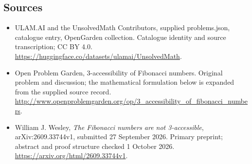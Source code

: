\documentclass[11pt,a4paper]{article}
\begin{document}
\subsection{Sources}
\begin{itemize}
\item[S1] ULAM.AI and the UnsolvedMath Contributors, supplied problems.json, catalogue entry, OpenGarden collection. Catalogue identity and source transcription; CC BY 4.0.
\url{https://huggingface.co/datasets/ulamai/UnsolvedMath}.
\item[S2] Open Problem Garden, 3-accessibility of Fibonacci numbers. Original problem and discussion; the mathematical formulation below is expanded from the supplied source record.
\url{http://www.openproblemgarden.org/op/3_accessibility_of_fibonacci_numbers}.

\item[R1] William J. Wesley, \emph{The Fibonacci numbers are not
3-accessible}, arXiv:2609.33744v1, submitted 27 September 2026.
Primary preprint; abstract and proof structure checked 1 October 2026.
\url{https://arxiv.org/html/2609.33744v1}.

\end{itemize}
\end{document}

